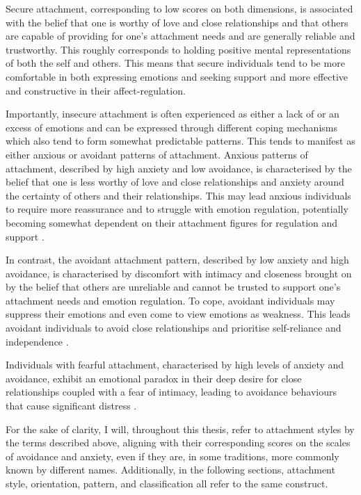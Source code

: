 \documentclass[12pt]{report}
\begin{document}
Secure attachment, corresponding to low scores on both dimensions, is associated with the belief that one is worthy of love and close relationships and that others are capable of providing for one's attachment needs and are generally reliable and trustworthy.
This roughly corresponds to holding positive mental representations of both the self and others.
This means that secure individuals tend to be more comfortable in both expressing emotions and seeking support and more effective and constructive in their affect-regulation.

Importantly, insecure attachment is often experienced as either a lack of or an excess of emotions and can be expressed through different coping mechanisms which also tend to form somewhat predictable patterns.
This tends to manifest as either anxious or avoidant patterns of attachment. Anxious patterns of attachment, described by high anxiety and low avoidance, is characterised by the belief that one is less worthy of love and close relationships and anxiety around the certainty of others and their relationships.
This may lead anxious individuals to require more reassurance and to struggle with emotion regulation, potentially becoming somewhat dependent on their attachment figures for regulation and support \cite{Hudson2020}.

In contrast, the avoidant attachment pattern, described by low anxiety and high avoidance, is characterised by discomfort with intimacy and closeness brought on by the belief that others are unreliable and cannot be trusted to support one's attachment needs and emotion regulation.
To cope, avoidant individuals may suppress their emotions and even come to view emotions as weakness.
This leads avoidant individuals to avoid close relationships and prioritise self-reliance and independence \cite{Mikulincer2013,Hudson2020}.

Individuals with fearful attachment, characterised by high levels of anxiety and avoidance, exhibit an emotional paradox in their deep desire for close relationships coupled with a fear of intimacy, leading to avoidance behaviours that cause significant distress \cite{Bartholomew1991}.

For the sake of clarity, I will, throughout this thesis, refer to attachment styles by the terms described above, aligning with their corresponding scores on the scales of avoidance and anxiety, even if they are, in some traditions, more commonly known by different names.
Additionally, in the following sections, attachment style, orientation, pattern, and classification all refer to the same construct.
\end{document}
